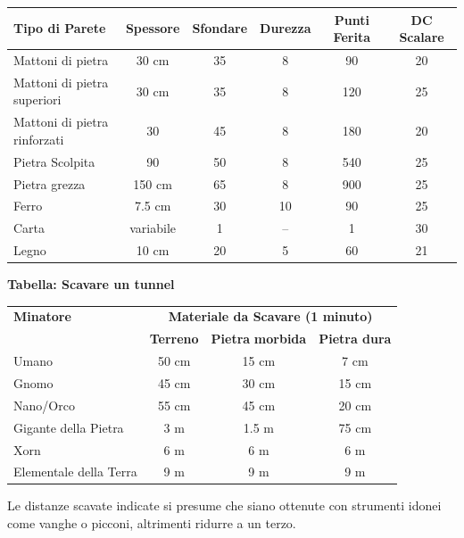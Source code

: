 \noindent\begin{tabularx}{\linewidth}{Xccccc}
	\toprule
\rowcolor{gray!20}\textbf{Tipo di Parete} & \textbf{Spessore} & \textbf{Sfondare} & \textbf{Durezza} & \textbf{Punti Ferita} & \textbf{DC Scalare}\\
\toprule
Mattoni di pietra & 30 cm& 35 & 8 & 90& 20\\
\rowcolor{gray!20}Mattoni di pietra superiori & 30 cm& 35 & 8 & 120 & 25\\
Mattoni di pietra rinforzati & 30 & 45 & 8 & 180 & 20\\
\rowcolor{gray!20}Pietra Scolpita & 90 & 50 & 8 & 540 & 25\\
Pietra grezza & 150 cm & 65 & 8 & 900 & 25\\
\rowcolor{gray!20}Ferro & 7.5 cm & 30 & 10& 90& 25\\
Carta & variabile & 1 & --& 1 & 30\\
\rowcolor{gray!20}Legno & 10 cm& 20 & 5 & 60& 21
\end{tabularx}

\medskip

\textbf{Tabella: Scavare un tunnel}

\medskip

\noindent\begin{tabularx}{\linewidth}{Xccc}
	\toprule
\rowcolor{gray!20}\textbf{Minatore}&\multicolumn{3}{c}{\textbf{Materiale da Scavare (1 minuto)}}\\
&\textbf{Terreno}&\textbf{Pietra} \textbf{morbida}&\textbf{Pietra dura}\\
\toprule
Umano&50 cm&15 cm&7 cm\\
\rowcolor{gray!20}Gnomo &45 cm&30 cm&15 cm\\
Nano/Orco & 55 cm&45 cm&20 cm\\
\rowcolor{gray!20}Gigante della Pietra& 3 m& 1.5 m& 75 cm\\
Xorn &6 m&6 m& 6 m\\
\rowcolor{gray!20}Elementale della Terra & 9 m&9 m&9 m
\end{tabularx}

\medskip

Le distanze scavate indicate si presume che siano ottenute con strumenti idonei come vanghe o picconi, altrimenti ridurre a un terzo.

